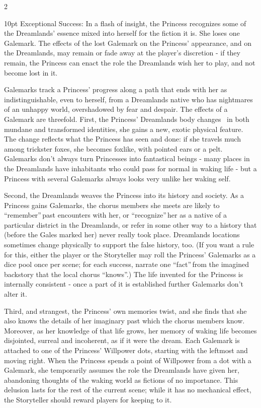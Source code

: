 \begin{multicols}{2}
\begin{myindentpar}{10pt}
    Exceptional Success: In a flash of insight, the Princess recognizes some of the Dreamlands' essence mixed into herself for the fiction it is. She loses one Galemark. The effects of the lost Galemark on the Princess' appearance, and on the Dreamlands, may remain or fade away at the player's discretion - if they remain, the Princess can enact the role the Dreamlands wish her to play, and not become lost in it. \end{myindentpar}

Galemarks track a Princess' progress along a path that ends with her as indistinguishable, even to herself, from a Dreamlands native who has nightmares of an unhappy world, overshadowed by fear and despair. The effects of a Galemark are threefold. First, the Princess' Dreamlands body changes \textendash\, in both mundane and transformed identities, she gains a new, exotic physical feature. The change reflects what the Princess has seen and done: if she travels much among trickster foxes, she becomes foxlike, with pointed ears or a pelt. Galemarks don't always turn Princesses into fantastical beings - many places in the Dreamlands have inhabitants who could pass for normal in waking life - but a Princess with several Galemarks always looks very unlike her waking self.

Second, the Dreamlands weaves the Princess into its history and society. As a Princess gains Galemarks, the chorus members she meets are likely to \textquotedblleft remember\textquotedblright\,past encounters with her, or \textquotedblleft recognize\textquotedblright\,her as a native of a particular district in the Dreamlands, or refer in some other way to a history that (before the Gales marked her) never really took place. Dreamlands locations sometimes change physically to support the false history, too. (If you want a rule for this, either the player or the Storyteller may roll the Princess' Galemarks as a dice pool once per scene; for each success, narrate one \textquotedblleft fact\textquotedblright\,from the imagined backstory that the local chorus \textquotedblleft knows\textquotedblright.) The life invented for the Princess is internally consistent - once a part of it is established further Galemarks don't alter it.

Third, and strangest, the Princess' own memories twist, and she finds that she also knows the details of her imaginary past which the chorus members know. Moreover, as her knowledge of that life grows, her memory of waking life becomes disjointed, surreal and incoherent, as if it were the dream. Each Galemark is attached to one of the Princess' Willpower dots, starting with the leftmost and moving right. When the Princess spends a point of Willpower from a dot with a Galemark, she temporarily assumes the role the Dreamlands have given her, abandoning thoughts of the waking world as fictions of no importance. This delusion lasts for the rest of the current scene; while it has no mechanical effect, the Storyteller should reward players for keeping to it.


\end{multicols}
